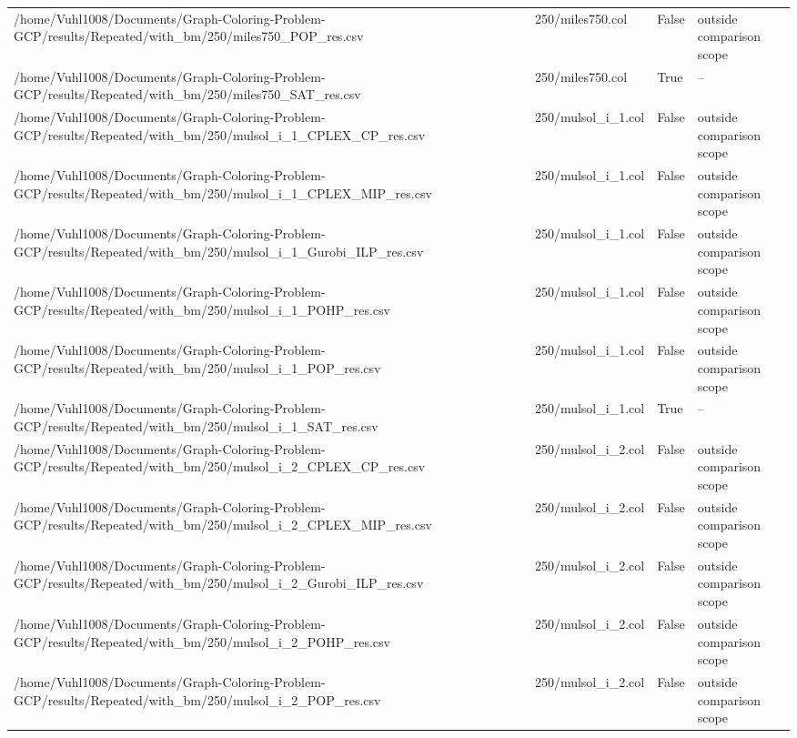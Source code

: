 \begin{table}[htbp]
\begin{tabular}{llll}
/home/Vuhl1008/Documents/Graph-Coloring-Problem-GCP/results/Repeated/with\_bm/250/miles750\_POP\_res.csv & 250/miles750.col & False & outside comparison scope \\
/home/Vuhl1008/Documents/Graph-Coloring-Problem-GCP/results/Repeated/with\_bm/250/miles750\_SAT\_res.csv & 250/miles750.col & True & -- \\
/home/Vuhl1008/Documents/Graph-Coloring-Problem-GCP/results/Repeated/with\_bm/250/mulsol\_i\_1\_CPLEX\_CP\_res.csv & 250/mulsol\_i\_1.col & False & outside comparison scope \\
/home/Vuhl1008/Documents/Graph-Coloring-Problem-GCP/results/Repeated/with\_bm/250/mulsol\_i\_1\_CPLEX\_MIP\_res.csv & 250/mulsol\_i\_1.col & False & outside comparison scope \\
/home/Vuhl1008/Documents/Graph-Coloring-Problem-GCP/results/Repeated/with\_bm/250/mulsol\_i\_1\_Gurobi\_ILP\_res.csv & 250/mulsol\_i\_1.col & False & outside comparison scope \\
/home/Vuhl1008/Documents/Graph-Coloring-Problem-GCP/results/Repeated/with\_bm/250/mulsol\_i\_1\_POHP\_res.csv & 250/mulsol\_i\_1.col & False & outside comparison scope \\
/home/Vuhl1008/Documents/Graph-Coloring-Problem-GCP/results/Repeated/with\_bm/250/mulsol\_i\_1\_POP\_res.csv & 250/mulsol\_i\_1.col & False & outside comparison scope \\
/home/Vuhl1008/Documents/Graph-Coloring-Problem-GCP/results/Repeated/with\_bm/250/mulsol\_i\_1\_SAT\_res.csv & 250/mulsol\_i\_1.col & True & -- \\
/home/Vuhl1008/Documents/Graph-Coloring-Problem-GCP/results/Repeated/with\_bm/250/mulsol\_i\_2\_CPLEX\_CP\_res.csv & 250/mulsol\_i\_2.col & False & outside comparison scope \\
/home/Vuhl1008/Documents/Graph-Coloring-Problem-GCP/results/Repeated/with\_bm/250/mulsol\_i\_2\_CPLEX\_MIP\_res.csv & 250/mulsol\_i\_2.col & False & outside comparison scope \\
/home/Vuhl1008/Documents/Graph-Coloring-Problem-GCP/results/Repeated/with\_bm/250/mulsol\_i\_2\_Gurobi\_ILP\_res.csv & 250/mulsol\_i\_2.col & False & outside comparison scope \\
/home/Vuhl1008/Documents/Graph-Coloring-Problem-GCP/results/Repeated/with\_bm/250/mulsol\_i\_2\_POHP\_res.csv & 250/mulsol\_i\_2.col & False & outside comparison scope \\
/home/Vuhl1008/Documents/Graph-Coloring-Problem-GCP/results/Repeated/with\_bm/250/mulsol\_i\_2\_POP\_res.csv & 250/mulsol\_i\_2.col & False & outside comparison scope \\

\end{tabular}
\end{table}
